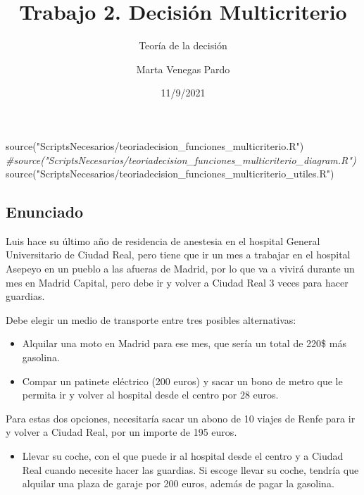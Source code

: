 \documentclass[
]{article}
\title{Trabajo 2. Decisión Multicriterio}
\subtitle{Teoría de la decisión}
\author{Marta Venegas Pardo}
\date{11/9/2021}
\newenvironment{Shaded}{\begin{snugshade}}{\end{snugshade}}
\newcommand{\CommentTok}[1]{\textcolor[rgb]{0.56,0.35,0.01}{\textit{#1}}}
\newcommand{\FunctionTok}[1]{\textcolor[rgb]{0.00,0.00,0.00}{#1}}
\newcommand{\NormalTok}[1]{#1}
\newcommand{\StringTok}[1]{\textcolor[rgb]{0.31,0.60,0.02}{#1}}
\providecommand{\tightlist}{%
  \setlength{\itemsep}{0pt}\setlength{\parskip}{0pt}}
\begin{document}
\maketitle

{
\setcounter{tocdepth}{4}
\tableofcontents
}
\begin{Shaded}
\begin{Highlighting}[]
\FunctionTok{source}\NormalTok{(}\StringTok{"ScriptsNecesarios/teoriadecision\_funciones\_multicriterio.R"}\NormalTok{)}
\CommentTok{\#source("ScriptsNecesarios/teoriadecision\_funciones\_multicriterio\_diagram.R")}
\FunctionTok{source}\NormalTok{(}\StringTok{"ScriptsNecesarios/teoriadecision\_funciones\_multicriterio\_utiles.R"}\NormalTok{)}
\end{Highlighting}
\end{Shaded}

\hypertarget{enunciado}{%
\subsection{Enunciado}\label{enunciado}}

Luis hace su último año de residencia de anestesia en el hospital
General Universitario de Ciudad Real, pero tiene que ir un mes a
trabajar en el hospital Asepeyo en un pueblo a las afueras de Madrid,
por lo que va a vivirá durante un mes en Madrid Capital, pero debe ir y
volver a Ciudad Real 3 veces para hacer guardias.

Debe elegir un medio de transporte entre tres posibles alternativas:

\begin{itemize}
\item
  Alquilar una moto en Madrid para ese mes, que sería un total de 220\$
  más gasolina.
\item
  Compar un patinete eléctrico (200 euros) y sacar un bono de metro que
  le permita ir y volver al hospital desde el centro por 28 euros.
\end{itemize}

Para estas dos opciones, necesitaría sacar un abono de 10 viajes de
Renfe para ir y volver a Ciudad Real, por un importe de 195 euros.

\begin{itemize}
\tightlist
\item
  Llevar su coche, con el que puede ir al hospital desde el centro y a
  Ciudad Real cuando necesite hacer las guardias. Si escoge llevar su
  coche, tendría que alquilar una plaza de garaje por 200 euros, además
  de pagar la gasolina.
\end{itemize}
\end{document}
